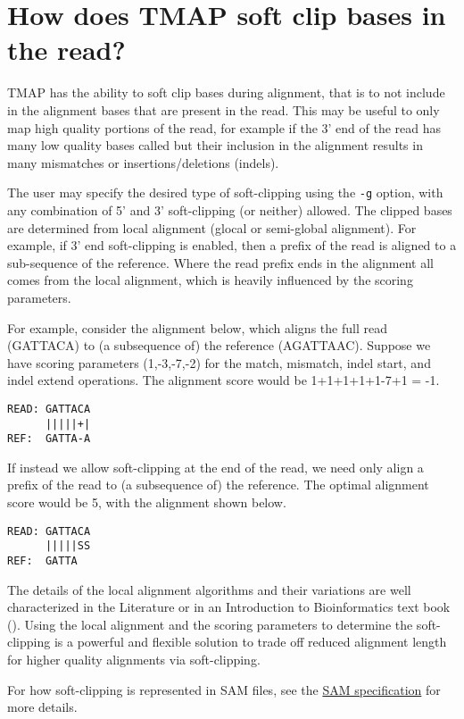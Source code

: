 \documentclass[a4paper,12pt]{book}
\newcommand{\TT}[1]{{\tt #1}} %
\begin{document}
\section{How does TMAP soft clip bases in the read?} 
\label{sec:howtosoftclip}
TMAP has the ability to soft clip bases during alignment, that is to not include in the alignment bases that are present in the read.  
This may be useful to only map high quality portions of the read, for example if the 3' end of the read has many low quality bases called but their inclusion in the alignment results in many mismatches or insertions/deletions (indels).

The user may specify the desired type of soft-clipping using the \TT{-g} option, with any combination of 5' and 3' soft-clipping (or neither) allowed. 
The clipped bases are determined from local alignment (glocal or semi-global alignment).  
For example, if 3' end soft-clipping is enabled, then a prefix of the read is aligned to a sub-sequence of the reference.  
Where the read prefix ends in the alignment all comes from the local alignment, which is heavily influenced by the scoring parameters. 

For example, consider the alignment below, which aligns the full read (GATTACA) to (a subsequence of) the reference (AGATTAAC).  
Suppose we have scoring parameters (1,-3,-7,-2) for the match, mismatch, indel start, and indel extend operations.  
The alignment score would be 1+1+1+1+1-7+1 = -1.

\begin{verbatim}
READ: GATTACA
      |||||+|
REF:  GATTA-A
\end{verbatim}

If instead we allow soft-clipping at the end of the read, we need only align a prefix of the read to (a subsequence of) the reference.  
The optimal alignment score would be 5, with the alignment shown below.
\begin{verbatim}
READ: GATTACA
      |||||SS
REF:  GATTA
\end{verbatim}

The details of the local alignment algorithms and their variations are well characterized in the Literature or in an Introduction to Bioinformatics text book (\cite{jones2004}).  
Using the local alignment and the scoring parameters to determine the soft-clipping is a powerful and flexible solution to trade off reduced alignment length for higher quality alignments via soft-clipping.

For how soft-clipping is represented in SAM files, see the \href{http://samtools.sourceforge.net/SAM1.pdf}{SAM specification} for more details.
\end{document}
